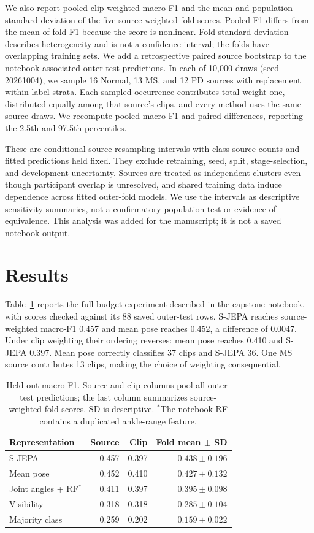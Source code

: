 \documentclass[10pt,twocolumn,letterpaper]{article}
\begin{document}
We also report pooled clip-weighted macro-F1 and the mean and population standard deviation of the five source-weighted fold scores. Pooled F1 differs from the mean of fold F1 because the score is nonlinear. Fold standard deviation describes heterogeneity and is not a confidence interval; the folds have overlapping training sets. We add a retrospective paired source bootstrap to the notebook-associated outer-test predictions. In each of 10,000 draws (seed 20261004), we sample 16 Normal, 13 MS, and 12 PD sources with replacement within label strata. Each sampled occurrence contributes total weight one, distributed equally among that source's clips, and every method uses the same source draws. We recompute pooled macro-F1 and paired differences, reporting the 2.5th and 97.5th percentiles.

These are conditional source-resampling intervals with class-source counts and fitted predictions held fixed. They exclude retraining, seed, split, stage-selection, and development uncertainty. Sources are treated as independent clusters even though participant overlap is unresolved, and shared training data induce dependence across fitted outer-fold models. We use the intervals as descriptive sensitivity summaries, not a confirmatory population test or evidence of equivalence. This analysis was added for the manuscript; it is not a saved notebook output.

\section{Results}
Table~\ref{tab:results} reports the full-budget experiment described in the capstone notebook, with scores checked against its 88 saved outer-test rows. S-JEPA reaches source-weighted macro-F1 0.457 and mean pose reaches 0.452, a difference of 0.0047. Under clip weighting their ordering reverses: mean pose reaches 0.410 and S-JEPA 0.397. Mean pose correctly classifies 37 clips and S-JEPA 36. One MS source contributes 13 clips, making the choice of weighting consequential.

\begin{table}[t]
\centering
\caption{Held-out macro-F1. Source and clip columns pool all outer-test predictions; the last column summarizes source-weighted fold scores. SD is descriptive. $^*$The notebook RF contains a duplicated ankle-range feature.}
\label{tab:results}
\small
\setlength{\tabcolsep}{4pt}
\begin{tabular}{lrrr}
\toprule
Representation & Source & Clip & Fold mean $\pm$ SD\\
\midrule
S-JEPA &0.457&0.397&$0.438\pm0.196$\\
Mean pose &0.452&0.410&$0.427\pm0.132$\\
Joint angles + RF$^*$ &0.411&0.397&$0.395\pm0.098$\\
Visibility &0.318&0.318&$0.285\pm0.104$\\
Majority class &0.259&0.202&$0.159\pm0.022$\\
\bottomrule
\end{tabular}
\end{table}
\end{document}
